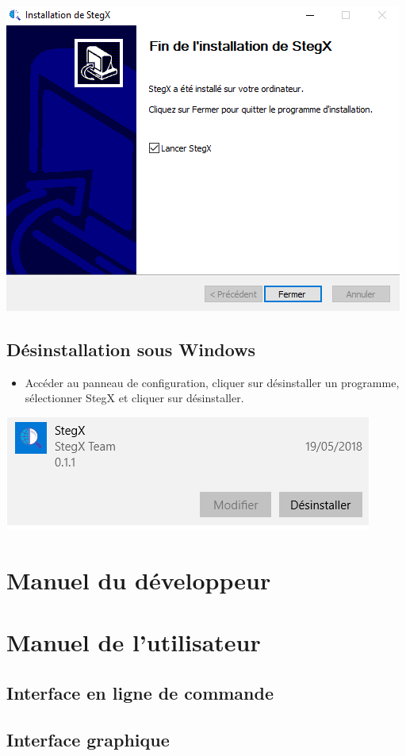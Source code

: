\documentclass[11pt]{article}
\begin{document}
\hspace{1cm}
\includegraphics[scale=1]{pictures/fin.png}
\vspace{1cm}

\subsection{Désinstallation sous Windows}

\begin{itemize}
\item Accéder au panneau de configuration, cliquer sur désinstaller un programme,
sélectionner StegX et cliquer sur désinstaller.
\end{itemize}

\hspace{3cm}
\includegraphics[scale=0.6]{pictures/desinstall.png}
\vspace{1cm}

\section{Manuel du développeur}

\section{Manuel de l'utilisateur}

\subsection{Interface en ligne de commande}

\subsection{Interface graphique}
\end{document}
